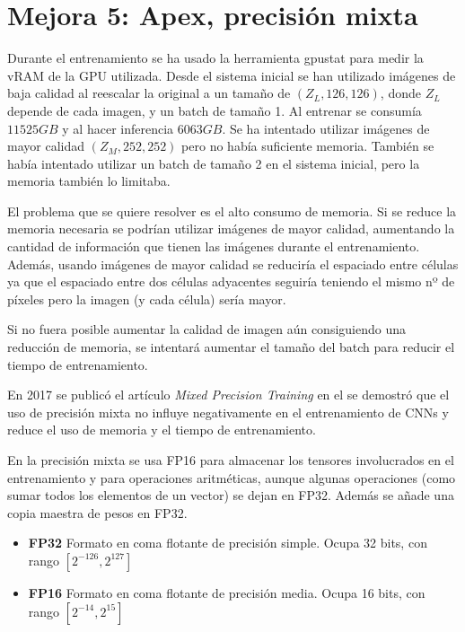 \chapter{Mejora 5: Apex, precisión mixta}\label{apex}

Durante el entrenamiento se ha usado la herramienta gpustat \cite{wookayin} para medir la vRAM de la GPU utilizada. Desde el sistema inicial se han utilizado imágenes de baja calidad al reescalar la original a un tamaño de $(Z_L, 126, 126)$, donde $Z_L$ depende de cada imagen, y un batch de tamaño 1. Al entrenar se consumía $11525GB$ y al hacer inferencia $6063GB$. Se ha intentado utilizar imágenes de mayor calidad $(Z_M, 252, 252)$ pero no había suficiente memoria. También se había intentado utilizar un batch de tamaño 2 en el sistema inicial, pero la memoria también lo limitaba.

El problema que se quiere resolver es el alto consumo de memoria. Si se reduce la memoria necesaria se podrían utilizar imágenes de mayor calidad, aumentando la cantidad de información que tienen las imágenes durante el entrenamiento. Además, usando imágenes de mayor calidad se reduciría el espaciado entre células ya que el espaciado entre dos células adyacentes seguiría teniendo el mismo nº de píxeles pero la imagen (y cada célula) sería mayor.

Si no fuera posible aumentar la calidad de imagen aún consiguiendo una reducción de memoria, se intentará aumentar el tamaño del batch para reducir el tiempo de entrenamiento.

En 2017 se publicó el artículo \textit{Mixed Precision Training} en el se demostró que el uso de precisión mixta no influye negativamente en el entrenamiento de CNNs \cite{Micikevicius2018} y reduce el uso de memoria y el tiempo de entrenamiento.

En la precisión mixta se usa FP16 para almacenar los tensores involucrados en el entrenamiento y para operaciones aritméticas, aunque algunas operaciones (como sumar todos los elementos de un vector) se dejan en FP32. Además se añade una copia maestra de pesos en FP32.

\begin{itemize}
\item \textbf{FP32} Formato en coma flotante de precisión simple. Ocupa 32 bits, con rango $[2^{-126},2^{127}]$
\item \textbf{FP16} Formato en coma flotante de precisión media. Ocupa 16 bits, con rango $[2^{-14},2^{15}]$
\end{itemize}

